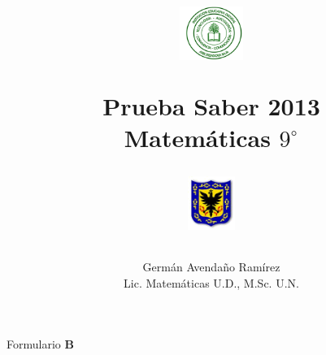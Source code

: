\documentclass[10pt,letterpaper,addpoints]{exam}
\begin{document}
\title{\begin{minipage}{.2\textwidth}
        \includegraphics[height=1.75cm]{Images/logo-colegio.png}
       \end{minipage}
\begin{minipage}{.55\textwidth}
 \begin{center}
Prueba Saber 2013\\Matemáticas $9^{\circ}$
\end{center}
\end{minipage}
\begin{minipage}{.2\textwidth}
\includegraphics[height=1.75cm]{Images/logo-sed.png} 
\end{minipage}
}
\author{Germ\'{a}n Avendaño Ram\'{i}rez\\Lic. Matemáticas U.D., M.Sc. U.N.}
\date{}
\maketitle
\begin{center}
\end{center}
\begin{center}
Formulario \textbf{B}
\end{center}
\setlength{\columnsep}{2pc}
\end{document}

